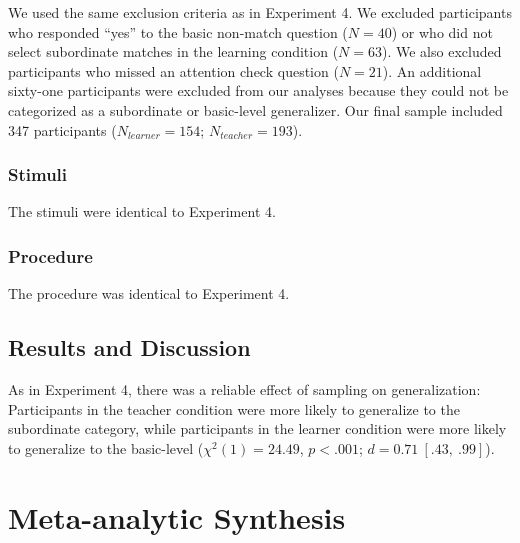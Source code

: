 \documentclass[man]{apa2}
\begin{document}
We used the same exclusion criteria as in Experiment 4. We excluded participants who responded ``yes'' to the basic non-match question ($N=40$) or who did not select subordinate matches in the learning condition ($N = 63$). We also excluded participants who missed an attention check question ($N = 21$). An additional sixty-one participants were excluded from our analyses because they could not be categorized as a subordinate or basic-level generalizer. Our final sample included 347 participants ($N_{learner} = 154$; $N_{teacher} = 193$). 

\subsubsection{Stimuli}

The stimuli were identical to Experiment 4.

\subsubsection{Procedure}

The procedure was identical to Experiment 4.

\subsection{Results and Discussion}

As in Experiment 4, there was a reliable effect of sampling on generalization: Participants in the teacher condition were more likely to generalize to the subordinate category, while participants in the learner condition were more likely to generalize to the basic-level ($\chi^2(1) = 24.49$, $p <.001$; $d = 0.71\ [.43,\ .99]$).

\section{Meta-analytic Synthesis}
\end{document}
